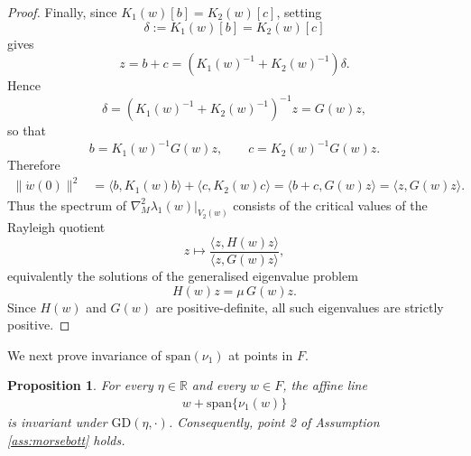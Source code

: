 \documentclass{article}
\newcommand{\RB}{\mathbb{R}}
\newcommand{\GD}{\mathrm{GD}}
\theoremstyle{plain}
\newtheorem{proposition}[theorem]{Proposition}
\theoremstyle{definition}
\theoremstyle{remark}
\begin{document}
\begin{proof}
    Finally, since $K_1(w)[b]=K_2(w)[c]$, setting
    \[
    \delta:=K_1(w)[b]=K_2(w)[c]
    \]
    gives
    \[
    z=b+c=(K_1(w)^{-1}+K_2(w)^{-1})\delta.
    \]
    Hence
    \[
    \delta=(K_1(w)^{-1}+K_2(w)^{-1})^{-1}z=G(w)z,
    \]
    so that
    \[
    b=K_1(w)^{-1}G(w)z,\qquad c=K_2(w)^{-1}G(w)z.
    \]
    Therefore
    \begin{align}
    \|\dot w(0)\|^2
    &=
    \langle b,K_1(w)b\rangle+\langle c,K_2(w)c\rangle
    =
    \langle b+c,G(w)z\rangle
    =
    \langle z,G(w)z\rangle.
    \end{align}
    Thus the spectrum of $\nabla^2_M\lambda_1(w)|_{V_2(w)}$ consists of the critical values of the
    Rayleigh quotient
    \[
    z\mapsto \frac{\langle z,H(w)z\rangle}{\langle z,G(w)z\rangle},
    \]
    equivalently the solutions of the generalised eigenvalue problem
    \[
    H(w)z=\mu\,G(w)z.
    \]
    Since $H(w)$ and $G(w)$ are positive-definite, all such eigenvalues are strictly positive.
\end{proof}

We next prove invariance of $\mathrm{span}(\nu_1)$ at points in $F$.

\begin{proposition}\label{prop:GDlineinvariance}
    For every $\eta\in\RB$ and every $w\in F$, the affine line
    \begin{align}
        w+\mathrm{span}\{\nu_1(w)\}
    \end{align}
    is invariant under $\GD(\eta,\cdot)$. Consequently, point 2 of Assumption \ref{ass:morsebott} holds.
\end{proposition}
\end{document}

